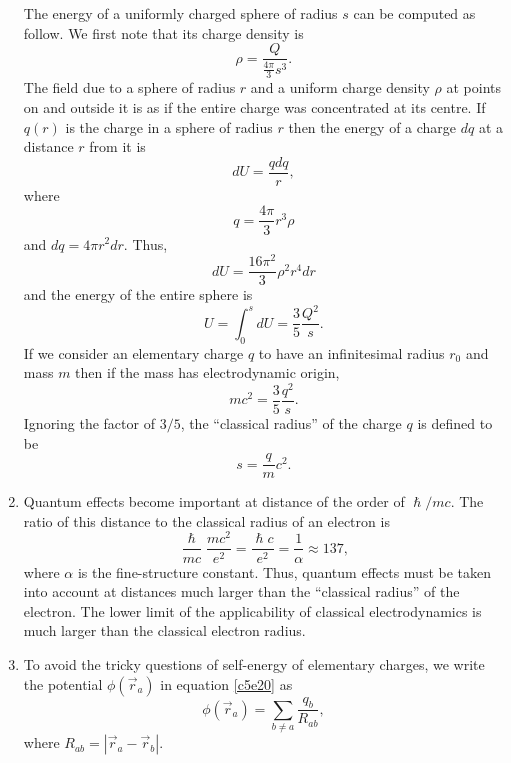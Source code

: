 \begin{enumerate}
The energy of a uniformly charged sphere of radius $s$ can be computed as follow.
We first note that its charge density is
\begin{equation}\label{c5e21}
\rho = \frac{Q}{\frac{4\pi}{3}s^3}.
\end{equation}
The field due to a sphere of radius $r$ and a uniform charge density $\rho$ at 
points on and outside it is as if the entire charge was concentrated at its 
centre. If $q(r)$ is the charge in a sphere of radius $r$ then the energy
of a charge $dq$ at a distance $r$ from it is
\[
dU = \frac{qdq}{r},
\]
where 
\[
q = \frac{4\pi}{3}r^3 \rho
\]
and $dq = 4\pi r^2 dr$. Thus,
\[
dU = \frac{16\pi^2}{3}\rho^2 r^4dr
\]
and the energy of the entire sphere is
\begin{equation}\label{c5e22}
U = \int_0^s dU = \frac{3}{5}\frac{Q^2}{s}.
\end{equation}
If we consider an elementary charge $q$ to have an infinitesimal radius $r_0$ and
mass $m$ then if the mass has electrodynamic origin,
\[
mc^2 = \frac{3}{5}\frac{q^2}{s}.
\]
Ignoring the factor of $3/5$, the ``classical radius'' of the charge $q$ is defined
to be
\begin{equation}\label{c5e23}
s = \frac{q}{m} c^2.
\end{equation}

\item Quantum effects become important at distance of the order of $\hslash/mc$. The
ratio of this distance to the classical radius of an electron is
\[
\frac{\hslash}{mc}\frac{mc^2}{e^2} = \frac{\hslash c}{e^2} = \frac{1}{\alpha}
\approx 137,
\]
where $\alpha$ is the fine-structure constant. Thus, quantum effects must be taken
into account at distances much larger than the ``classical radius'' of the electron. 
The lower limit of the applicability of classical electrodynamics is much larger 
than the classical electron radius.

\item To avoid the tricky questions of self-energy of elementary charges, we write
the potential $\phi(\vec{r}_a)$ in equation \eqref{c5e20} as
\begin{equation}\label{c5e24}
\phi(\vec{r}_a) = \sum_{b \ne a} \frac{q_b}{R_{ab}},
\end{equation}
where $R_{ab} = |\vec{r}_a - \vec{r}_b|$.


\end{enumerate}
